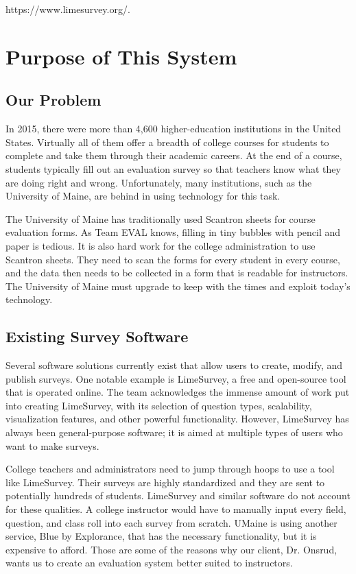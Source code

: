 \documentclass{article}
\begin{document}
https://www.limesurvey.org/.

\section{Purpose of This System}

\subsection{Our Problem}

In 2015, there were more than 4,600 higher-education institutions in the United States. Virtually all of them offer a breadth of college courses for students to complete and take them through their academic careers. At the end of a course, students typically fill out an evaluation survey so that teachers know what they are doing right and wrong. Unfortunately, many institutions, such as the University of Maine, are behind in using technology for this task.

The University of Maine has traditionally used Scantron sheets for course evaluation forms. As Team EVAL knows, filling in tiny bubbles with pencil and paper is tedious. It is also hard work for the college administration to use Scantron sheets. They need to scan the forms for every student in every course, and the data then needs to be collected in a form that is readable for instructors. The University of Maine must upgrade to keep with the times and exploit today's technology.

\subsection{Existing Survey Software}

Several software solutions currently exist that allow users to create, modify, and publish surveys. One notable example is LimeSurvey, a free and open-source tool that is operated online. The team acknowledges the immense amount of work put into creating LimeSurvey, with its selection of question types, scalability, visualization features, and other powerful functionality. However, LimeSurvey has always been general-purpose software; it is aimed at multiple types of users who want to make surveys.

College teachers and administrators need to jump through hoops to use a tool like LimeSurvey. Their surveys are highly standardized and they are sent to potentially hundreds of students. LimeSurvey and similar software do not account for these qualities. A college instructor would have to manually input every field, question, and class roll into each survey from scratch.  UMaine is using another service, Blue by Explorance, that has the necessary functionality, but it is expensive to afford. Those are some of the reasons why our client, Dr. Onsrud, wants us to create an evaluation system better suited to instructors.
\end{document}
